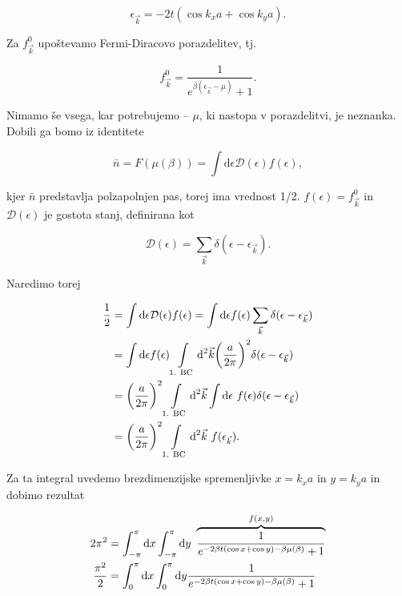 \documentclass[a4paper, 12pt]{article}
\newcommand{\e}{
	\ensuremath{\epsilon}
}
\newcommand{\vk}{
	\ensuremath{\vec{k}}
}
\renewcommand{\ni}{
	\noindent
}
\newcommand{\dd}{
	\ensuremath{\text{d}}
}
\begin{document}
\begin{equation}
	\e_{\vk} = -2t (\cos k_x a + \cos k_y a).
\end{equation}

\ni Za $f_{\vk}^0$ upo\v stevamo Fermi-Diracovo porazdelitev, tj.

\begin{equation}
	f_{\vk}^0 = \frac{1}{e^{\beta(\e_{\vk} - \mu)} + 1}.
	\label{favela}
\end{equation}

Nimamo \v se vsega, kar potrebujemo -- $\mu$, ki nastopa v porazdelitvi, je neznanka. Dobili ga bomo iz
identitete

\begin{equation}
	\bar{n} = F (\mu (\beta)) = \int \dd \e \mathcal{D}(\e) f(\e),
\end{equation}

\ni kjer $\bar{n}$ predstavlja polzapolnjen pas, torej ima vrednost 1/2. $f(\e) = f_{\vk}^0$ in 
$\mathcal{D}(\e)$ je gostota stanj, definirana kot

\begin{equation}
	\mathcal{D}(\e) = \sum_{\vk} \delta (\e - \e_{\vk}).
\end{equation}

\ni Naredimo torej

\begin{align}
	\frac{1}{2} &= \int \dd \e \mathcal{D} (\e) f (\e) = \int \dd \e f(\e) \sum_{\vk}
		\delta (\e - \e_{\vk}) \notag \\
	&= \int \dd \e f(\e) \int\limits_\text{1. BC} \dd^2 \vk \bigg(\frac{a}{2\pi}\bigg)^2
		\delta (\e - \e_{\vk}) \notag \\
	&= \bigg(\frac{a}{2\pi}\bigg)^2 \int\limits_\text{1. BC} \dd^2 \vk \int \dd \e\ f(\e)
		\delta (\e - \e_{\vk}) \notag \\
	&= \bigg(\frac{a}{2\pi}\bigg)^2 \int\limits_\text{1. BC} \dd^2 \vk\ f(\e_{\vk}).
\end{align}

Za ta integral uvedemo brezdimenzijske spremenljivke $x = k_x a$ in $y = k_y a$ in dobimo
rezultat

\begin{align}
	2\pi^2 &= \int_{-\pi}^\pi \dd x \int_{-\pi}^\pi \dd y\ \overbrace{\frac{1}
		{e^{-2\beta t(\cos x + \cos y) -\beta \mu (\beta)} + 1}}^{f(x,y)}\notag \\
	\frac{\pi^2}{2} &= \int_0^\pi \dd x \int_0^\pi \dd y \frac{1}{e^{-2\beta t(\cos x + \cos y)
		- \beta \mu (\beta)} + 1}
\end{align}
\end{document}
